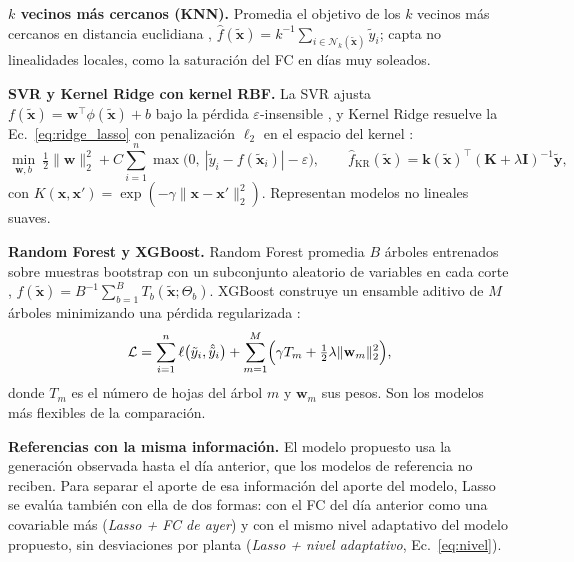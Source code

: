 \documentclass[pdflatex,sn-mathphys-num]{sn-jnl}
\begin{document}
\textbf{$k$ vecinos más cercanos (KNN).} Promedia el objetivo de los $k$ vecinos más cercanos en distancia euclidiana \cite{cover1967nn}, $\hat{f}(\tilde{\mathbf{x}}) = k^{-1}\sum_{i \in \mathcal{N}_k(\tilde{\mathbf{x}})} \tilde{y}_i$; capta no linealidades locales, como la saturación del FC en días muy soleados.

\textbf{SVR y Kernel Ridge con kernel RBF.} La SVR ajusta $f(\tilde{\mathbf{x}}) = \mathbf{w}^\top\phi(\tilde{\mathbf{x}}) + b$ bajo la pérdida $\varepsilon$-insensible \cite{smola2004svr}, y Kernel Ridge resuelve la Ec.~\eqref{eq:ridge_lasso} con penalización $\ell_2$ en el espacio del kernel \cite{saunders1998krr}:
\begin{equation}
\min_{\mathbf{w},b}\ \tfrac{1}{2}\lVert\mathbf{w}\rVert_2^2 + C\sum_{i=1}^{n}\max\bigl(0,\ |\tilde{y}_i - f(\tilde{\mathbf{x}}_i)| - \varepsilon\bigr), \qquad
\hat{f}_{\text{KR}}(\tilde{\mathbf{x}}) = \mathbf{k}(\tilde{\mathbf{x}})^\top (\mathbf{K} + \lambda \mathbf{I})^{-1}\tilde{\mathbf{y}},
\label{eq:svr}
\end{equation}
con $K(\mathbf{x},\mathbf{x}') = \exp(-\gamma\lVert\mathbf{x}-\mathbf{x}'\rVert_2^2)$. Representan modelos no lineales suaves.

\textbf{Random Forest y XGBoost.} Random Forest promedia $B$ árboles entrenados sobre muestras bootstrap con un subconjunto aleatorio de variables en cada corte \cite{breiman2001rf}, $\hat{f}(\tilde{\mathbf{x}}) = B^{-1}\sum_{b=1}^{B} T_b(\tilde{\mathbf{x}};\Theta_b)$. XGBoost construye un ensamble aditivo de $M$ árboles minimizando una pérdida regularizada \cite{chen2016xgboost}:
\begin{equation}
\mathcal{L} = \sum_{i=1}^{n}\ell\bigl(\tilde{y}_i,\hat{\tilde{y}}_i\bigr) + \sum_{m=1}^{M}\Bigl(\gamma T_m + \tfrac{1}{2}\lambda\lVert\mathbf{w}_m\rVert_2^2\Bigr),
\label{eq:xgb}
\end{equation}
donde $T_m$ es el número de hojas del árbol $m$ y $\mathbf{w}_m$ sus pesos. Son los modelos más flexibles de la comparación.

\textbf{Referencias con la misma información.} El modelo propuesto usa la generación observada hasta el día anterior, que los modelos de referencia no reciben. Para separar el aporte de esa información del aporte del modelo, Lasso se evalúa también con ella de dos formas: con el FC del día anterior como una covariable más (\emph{Lasso + FC de ayer}) y con el mismo nivel adaptativo del modelo propuesto, sin desviaciones por planta (\emph{Lasso + nivel adaptativo}, Ec.~\eqref{eq:nivel}).
\end{document}
